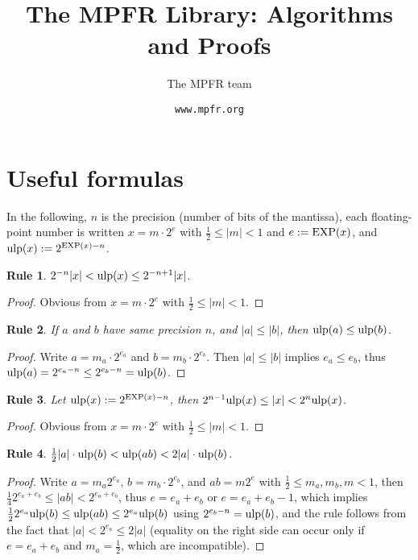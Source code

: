 \documentclass[12pt]{amsart}
\title{The MPFR Library: Algorithms and Proofs}
\author{The MPFR team}
\date{\tt www.mpfr.org}
\def\ulp{{\rm ulp}}
\newtheorem{Rule}{Rule}
\begin{document}
\maketitle



\section{Useful formulas}

In the following, $n$ is the precision (number of bits of the mantissa),
each floating-point number is written $x = m \cdot 2^e$
with $\frac{1}{2} \le |m| < 1$ and $e := {\rm EXP}(x)$, and
$\ulp(x) := 2^{{\rm EXP}(x) - n}$.

\begin{Rule} \label{R1}
$2^{-n} |x| < \ulp(x) \le 2^{-n+1} |x|$.
\end{Rule}
\begin{proof}
Obvious from $x = m \cdot 2^e$ with $\frac{1}{2} \le |m| < 1$.
\end{proof}

\begin{Rule} \label{R2}
If $a$ and $b$ have same precision $n$,
and $|a| \le |b|$, then $\ulp(a) \le \ulp(b)$.
\end{Rule}
\begin{proof}
Write $a = m_a \cdot 2^{e_a}$ and $b = m_b \cdot 2^{e_b}$.
Then $|a| \le |b|$ implies $e_a \le e_b$, thus
$\ulp(a) = 2^{e_a-n} \le 2^{e_b-n} = \ulp(b)$.
\end{proof}

\begin{Rule} \label{R3}
Let $\ulp(x) := 2^{{\rm EXP}(x) - n}$, then
$2^{n-1} \ulp(x) \le |x| < 2^{n} \ulp(x)$.
\end{Rule}
\begin{proof}
Obvious from $x = m \cdot 2^e$ with $\frac{1}{2} \le |m| < 1$.
\end{proof}

\begin{Rule} \label{R4}
$\frac{1}{2} |a| \cdot \ulp(b) < \ulp(a b) < 2 |a| \cdot \ulp(b)$.
\end{Rule}
\begin{proof}
Write $a = m_a 2^{e_a}$, $b = m_b \cdot 2^{e_b}$, and $a b = m 2^e$
with $\frac{1}{2} \le m_a, m_b, m < 1$,
then $\frac{1}{4} 2^{e_a+e_b} \le |a b| < 2^{e_a+e_b}$,
thus $e = e_a + e_b$ or $e = e_a + e_b - 1$, which implies
$\frac{1}{2} 2^{e_a} \ulp(b) \le \ulp(a b) \le 2^{e_a} \ulp(b)$
using $2^{e_b-n} = \ulp(b)$, and the rule follows from
the fact that $|a| < 2^{e_a} \le 2|a|$ (equality on the right side can
occur only if $e = e_a + e_b$ and $m_a = \frac{1}{2}$, which are
incompatible).
\end{proof}
\end{document}
